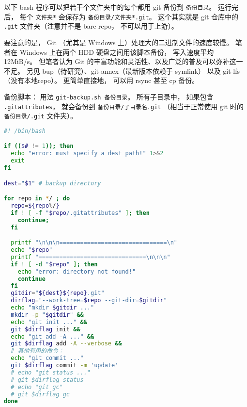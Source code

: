 
\begin{issues}
\issueDraft
\end{issues}


以下 bash 程序可以把若干个文件夹中的每个都用 git 备份到 \verb|备份目录|。 运行完后， 每个 \verb|文件夹*| 会保存为 \verb|备份目录/文件夹*.git|。 这个其实就是 git 仓库中的 \verb|.git| 文件夹（注意并不是 bare repo， 不可以用于上游）。

要注意的是， Git （尤其是 Windows 上）处理大的二进制文件的速度较慢。 笔者在 Windows 上在两个 HDD 硬盘之间用该脚本备份， 写入速度平均 12MiB/s。 但笔者认为 Git 的丰富功能和灵活性、以及广泛的普及可以弥补这一不足。 另见 bup（待研究）、git-annex（最新版本依赖于 symlink） 以及 git-lfs（没有本地repo）。 更简单直接地， 可以用 rsync 甚至 cp 备份。

备份脚本： 用法 \verb|git-backup.sh 备份目录|。 所有子目录中， 如果包含 \verb|.gitattributes|， 就会备份到 \verb|备份目录/子目录名.git| （相当于正常使用 git 时的 \verb|备份目录/.git| 文件夹）。
\begin{lstlisting}[language=bash, caption=git-backup.sh]
#! /bin/bash

if (($# != 1)); then
  echo "error: must specify a dest path!" 1>&2
  exit
fi

dest="$1" # backup directory

for repo in */ ; do
  repo=${repo%/}
  if ! [ -f "$repo/.gitattributes" ]; then
    continue;
  fi

  printf "\n\n\n===============================\n"
  echo "$repo"
  printf "===============================\n\n\n"
  if ! [ -d "$repo" ]; then
    echo "error: directory not found!"
    continue
  fi
  gitdir="${dest}${repo}.git"
  dirflag="--work-tree=$repo --git-dir=$gitdir"
  echo "mkdir $gitdir ..."
  mkdir -p "$gitdir" &&
  echo "git init ..." &&
  git $dirflag init &&
  echo "git add -A ..." &&
  git $dirflag add -A --verbose &&
  # 其他有用的命令：
  echo "git commit ..."
  git $dirflag commit -m 'update'
  # echo "git status ..."
  # git $dirflag status
  # echo "git gc"
  # git $dirflag gc
done
\end{lstlisting}


